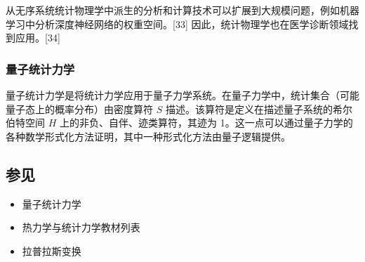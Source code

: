 从无序系统统计物理学中派生的分析和计算技术可以扩展到大规模问题，例如机器学习中分析深度神经网络的权重空间。[33] 因此，统计物理学也在医学诊断领域找到应用。[34]
\subsubsection{量子统计力学}
量子统计力学是将统计力学应用于量子力学系统。在量子力学中，统计集合（可能量子态上的概率分布）由密度算符 \( S \) 描述。该算符是定义在描述量子系统的希尔伯特空间 \( H \) 上的非负、自伴、迹类算符，其迹为 1。这一点可以通过量子力学的各种数学形式化方法证明，其中一种形式化方法由量子逻辑提供。
\subsection{参见} 
\begin{itemize}
\item 量子统计力学  
\item 热力学与统计力学教材列表  
\item 拉普拉斯变换  
\end{itemize}
